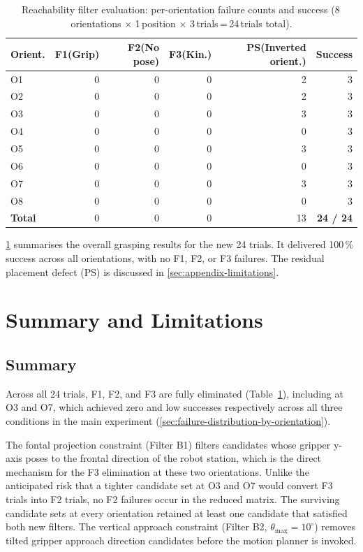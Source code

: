 \documentclass[oneside,studentpaper]{wbk}
\begin{document}
\begin{table}[htbp]
  \centering
  \caption{Reachability filter evaluation: per-orientation failure counts and success (8\,orientations $\times$ 1\,position $\times$ 3\,trials\,=\,24\,trials total).}
  \label{tab:appendix-results}
  \begin{tabular}{lrrrrr}
    \toprule
    Orient. & F1(Grip) & F2(No pose) & F3(Kin.) & PS(Inverted orient.) & Success \\
    \midrule
    O1 & 0 & 0 & 0 & 2 & 3 \\
    O2 & 0 & 0 & 0 & 2 & 3 \\
    O3 & 0 & 0 & 0 & 3 & 3 \\
    O4 & 0 & 0 & 0 & 0 & 3 \\
    O5 & 0 & 0 & 0 & 3 & 3 \\
    O6 & 0 & 0 & 0 & 0 & 3 \\
    O7 & 0 & 0 & 0 & 3 & 3 \\
    O8 & 0 & 0 & 0 & 0 & 3 \\
    \midrule
    \textbf{Total} & 0 & 0 & 0 & 13 & \textbf{24 / 24} \\
    \bottomrule
  \end{tabular}
\end{table}

\cref{tab:appendix-results} summarises the overall grasping results for the new 24 trials. It delivered 100\,\% success across all orientations, with no F1, F2, or F3 failures. The residual placement defect (PS) is discussed in \cref{sec:appendix-limitations}.

\section{Summary and Limitations}
\label{sec:appendix-analysis}

\subsection{Summary}
\label{sec:appendix-f1f3}

Across all 24 trials, F1, F2, and F3 are fully eliminated (Table~\ref{tab:appendix-results}), including at O3 and O7, which achieved zero and low successes respectively across all three conditions in the main experiment (\cref{sec:failure-distribution-by-orientation}).

The fontal projection constraint (Filter B1) filters candidates whose gripper y-axis poses to the frontal direction of the robot station, which is the direct mechanism for the F3 elimination at these two orientations. Unlike the anticipated risk that a tighter candidate set at O3 and O7 would convert F3 trials into F2 trials, no F2 failures occur in the reduced matrix. The surviving candidate sets at every orientation retained at least one candidate that satisfied both new filters.  The vertical approach constraint (Filter B2, $\theta_{\max} = 10^{\circ}$) removes tilted gripper approach direction candidates before the motion planner is invoked.
\end{document}
